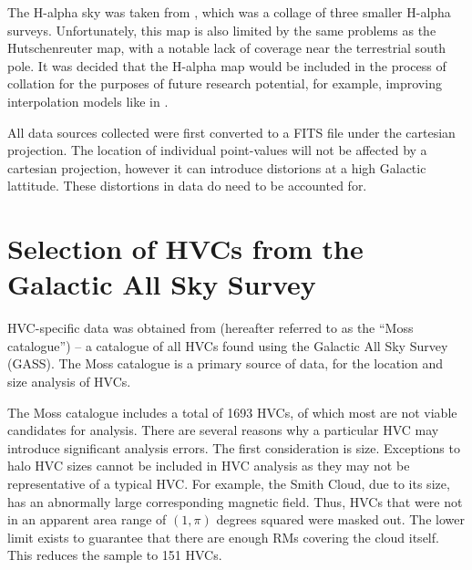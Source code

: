 The H-alpha sky was taken from \cite{ID43}, which was a collage of three smaller H-alpha surveys. Unfortunately, this map is also limited by the same problems as the Hutschenreuter map, with a notable lack of coverage near the terrestrial south pole. It was decided that the H-alpha map would be included in the process of collation for the purposes of future research potential, for example, improving interpolation models like in \cite{ID45, ID44}.


All data sources collected were first converted to a FITS file under the cartesian projection. The location of individual point-values will not be affected by a cartesian projection, however it can introduce distorions at a high Galactic lattitude. These distortions in data do need to be accounted for.


\section{Selection of HVCs from the Galactic All Sky Survey}
\label{sec:hvc_sel}

HVC-specific data was obtained from \cite{ID3} (hereafter referred to as the “Moss catalogue”) – a catalogue of all HVCs found using the Galactic All Sky Survey (GASS). The Moss catalogue is a primary source of data, for the location and size analysis of HVCs.


The Moss catalogue includes a total of 1693 HVCs, of which most are not viable candidates for analysis. There are several reasons why a particular HVC may introduce significant analysis errors. The first consideration is size. Exceptions to halo HVC sizes cannot be included in HVC analysis as they may not be representative of a typical HVC. For example, the Smith Cloud, due to its size, has an abnormally large corresponding magnetic field. Thus, HVCs that were not in an apparent area range of $(1,\pi)$ degrees squared were masked out. The lower limit exists to guarantee that there are enough RMs covering the cloud itself. This reduces the sample to 151 HVCs.



